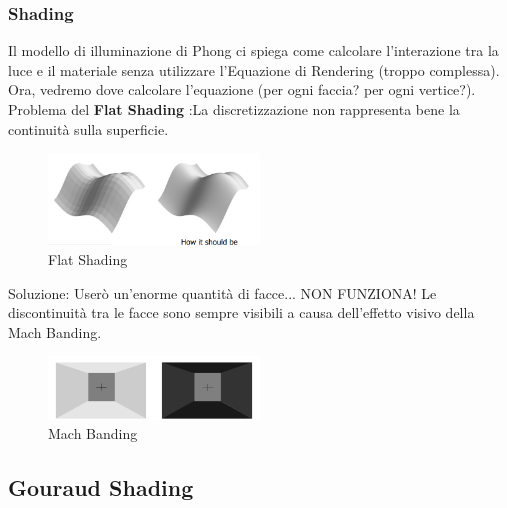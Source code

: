 \subsubsection{Shading}
Il modello di illuminazione di Phong ci spiega come calcolare l'interazione tra la luce e il materiale senza utilizzare l'Equazione di Rendering (troppo complessa).
Ora, vedremo dove calcolare l'equazione (per ogni faccia? per ogni vertice?).
Problema del \textbf{Flat Shading} :La discretizzazione non rappresenta bene la continuità sulla superficie.
\begin{figure}[H]
    \centering
    \includegraphics[width=0.5\textwidth]{images/Shading.png} 
    \caption{Flat Shading}
    \label{fig:immagine}
\end{figure}
Soluzione: Userò un'enorme quantità di facce...
NON FUNZIONA! Le discontinuità tra le facce sono sempre visibili a causa dell'effetto visivo della Mach Banding. \\
\begin{figure}[H]
    \centering
    \includegraphics[width=0.5\textwidth]{images/MatchBand.png} 
    \caption{Mach Banding}
    \label{fig:immagine}
\end{figure}
\subsection{Gouraud Shading}


